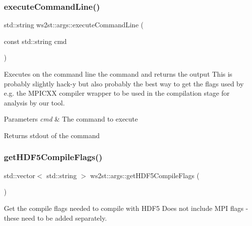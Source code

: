 \mbox{\label{namespacews2st_1_1args_a66c8edb18aef401f79d0a80ad4f42764}} 
\subsubsection{\texorpdfstring{execute\+Command\+Line()}{executeCommandLine()}\hspace{0.1cm}{\footnotesize\ttfamily [2/2]}}
{\footnotesize\ttfamily std\+::string ws2st\+::args\+::execute\+Command\+Line (\begin{DoxyParamCaption}\item[{const std\+::string}]{cmd }\end{DoxyParamCaption})}



Executes on the command line the command and returns the output This is probably slightly hack-\/y but also probably the best way to get the flags used by e.\+g. the M\+P\+I\+C\+XX compiler wrapper to be used in the compilation stage for analysis by our tool. 


\begin{DoxyParams}{Parameters}
{\em cmd} & The command to execute \\
\hline
\end{DoxyParams}
\begin{DoxyReturn}{Returns}
stdout of the command 
\end{DoxyReturn}
\mbox{\label{namespacews2st_1_1args_aa88c38554aaf9729dfb17f863bdf4ada}} 
\subsubsection{\texorpdfstring{get\+H\+D\+F5\+Compile\+Flags()}{getHDF5CompileFlags()}}
{\footnotesize\ttfamily std\+::vector$<$ std\+::string $>$ ws2st\+::args\+::get\+H\+D\+F5\+Compile\+Flags (\begin{DoxyParamCaption}{ }\end{DoxyParamCaption})}



Get the compile flags needed to compile with H\+D\+F5 Does not include M\+PI flags -\/ these need to be added separately. 

